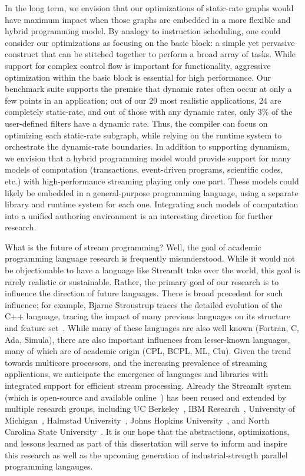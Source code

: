 In the long term, we envision that our optimizations of static-rate
graphs would have maximum impact when those graphs are embedded in a
more flexible and hybrid programming model.  By analogy to instruction
scheduling, one could consider our optimizations as focusing on the
basic block: a simple yet pervasive construct that can be stitched
together to perform a broad array of tasks.  While support for complex
control flow is important for functionality, aggressive optimization
within the basic block is essential for high performance.  Our
benchmark suite supports the premise that dynamic rates often occur at
only a few points in an application; out of our 29 most realistic
applications, 24 are completely static-rate, and out of those with any
dynamic rates, only 3\% of the user-defined filters have a dynamic
rate.  Thus, the compiler can focus on optimizing each static-rate
subgraph, while relying on the runtime system to orchestrate the
dynamic-rate boundaries.  In addition to supporting dynamism, we
envision that a hybrid programming model would provide support for
many models of computation (transactions, event-driven programs,
scientific codes, etc.) with high-performance streaming playing only
one part.  These models could likely be embedded in a general-purpose
programming language, using a separate library and runtime system for
each one.  Integrating such models of computation into a unified
authoring environment is an interesting direction for further
research.

What is the future of stream programming?  Well, the goal of academic
programming language research is frequently misunderstood.  While it
would not be objectionable to have a language like StreamIt take over
the world, this goal is rarely realistic or sustainable.  Rather, the
primary goal of our research is to influence the direction of future
languages.  There is broad precedent for such influence; for example,
Bjarne Stroustrup traces the detailed evolution of the C++ language,
tracing the impact of many previous languages on its structure and
feature set~\cite{stroustrup_design_1994}.  While many of these
languages are also well known (Fortran, C, Ada, Simula), there are
also important influences from lesser-known languages, many of which
are of academic origin (CPL, BCPL, ML, Clu).  Given the trend towards
multicore processors, and the increasing prevalence of streaming
applications, we anticipate the emergence of languages and libraries
with integrated support for efficient stream processing.  Already the
StreamIt system (which is open-source and available
online~\cite{streamitweb}) has been reused and extended by multiple
research groups, including UC
Berkeley~\cite{mani-permutations,bit-streaming}, IBM
Research~\cite{huang_liquid_2008,hormati_optimus:_2008}, University of
Michigan~\cite{kudlur_orchestratingexecution_2008,hormati_optimus:_2008},
Halmstad University~\cite{ola-techrep}, Johns Hopkins
University~\cite{duca-thesis}, and North Carolina State
University~\cite{won-thesis}.  It is our hope that the abstractions,
optimizations, and lessons learned as part of this dissertation will
serve to inform and inspire this research as well as the upcoming
generation of industrial-strength parallel programming langauges.

